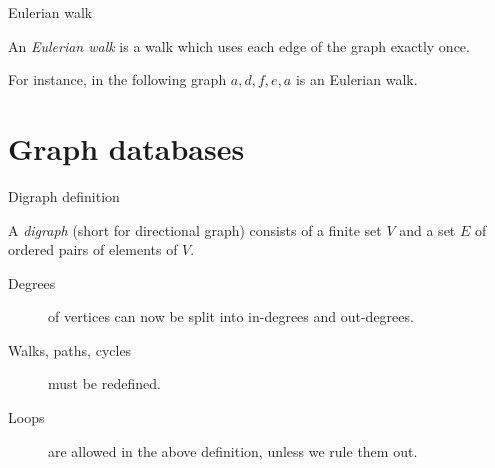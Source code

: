 \begin{frame}{Eulerian walk}
  
  \begin{definition}
    An \emph{Eulerian walk} is a walk which uses each edge of the graph exactly once.
  \end{definition}
  
  For instance, in the following graph $a,d,f,e,a$ is an Eulerian walk.
  \begin{center}
  \end{center}
\end{frame}


\section{Graph databases}


\begin{frame}{Digraph definition}
  \begin{definition}
    A \emph{digraph} (short for directional graph) consists of a finite set $V$ and a set $E$ of ordered pairs of elements of $V$.
  \end{definition}
  \vspace{0.25cm}
  \begin{description}
    \item[Degrees] of vertices can now be split into in-degrees and out-degrees.
    \item[Walks, paths, cycles] must be redefined.
    \item[Loops] are allowed in the above definition, unless we rule them out.
  \end{description}
\end{frame}


